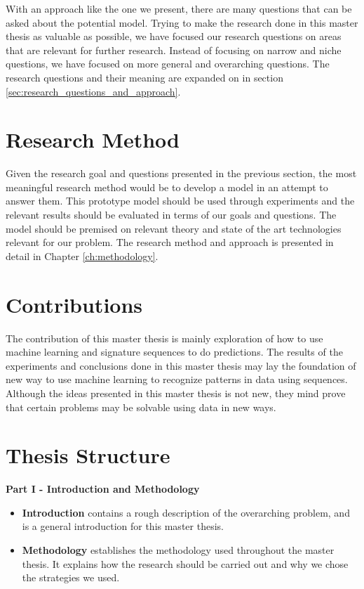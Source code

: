 With an approach like the one we present, there are many questions that can be asked about the potential model. Trying to make the research done in this master thesis as valuable as possible, we have focused our research questions on areas that are relevant for further research. Instead of focusing on narrow and niche questions, we have focused on more general and overarching questions. The research questions and their meaning are expanded on in section \ref{sec:research_questions_and_approach}.


\section{Research Method}
Given the research goal and questions presented in the previous section, the most meaningful research method would be to develop a model in an attempt to answer them. This prototype model should be used through experiments and the relevant results should be evaluated in terms of our goals and questions. The model should be premised on relevant theory and state of the art technologies relevant for our problem. The research method and approach is presented in detail in Chapter \ref{ch:methodology}.


\section{Contributions}
The contribution of this master thesis is mainly exploration of how to use machine learning and signature sequences to do predictions. The results of the experiments and conclusions done in this master thesis may lay the foundation of new way to use machine learning to recognize patterns in data using sequences. Although the ideas presented in this master thesis is not new, they mind prove that certain problems may be solvable using data in new ways.


\section{Thesis Structure}
\noindent
\begin{minipage}{\linewidth}
    \textbf{Part I - Introduction and Methodology}
    \begin{itemize}
        \item\textbf{Introduction} contains a rough description of the overarching problem, and is a general introduction for this master thesis.
        \item\textbf{Methodology} establishes the methodology used throughout the master thesis. It explains how the research should be carried out and why we chose the strategies we used.
    \end{itemize}
\end{minipage}

